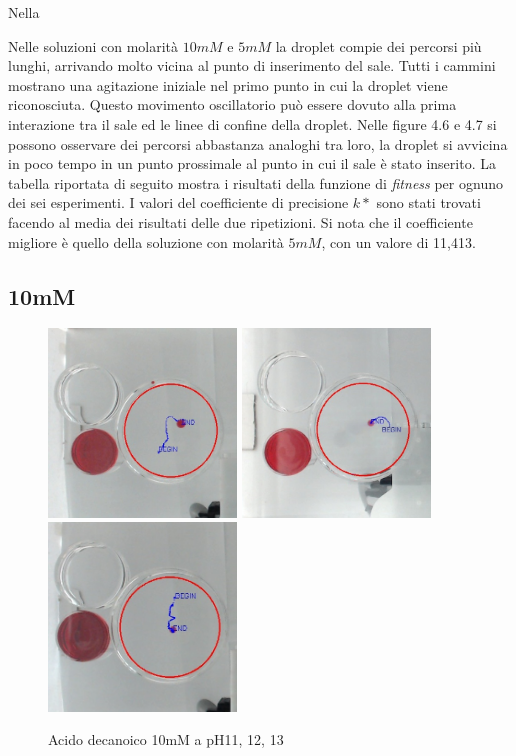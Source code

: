 Nella 




Nelle soluzioni con molarità $10mM$ e $5mM$ la droplet compie dei percorsi più lunghi, arrivando molto vicina al punto di inserimento del sale. Tutti i cammini mostrano una agitazione iniziale nel primo punto in cui la droplet viene riconosciuta. Questo movimento oscillatorio può essere dovuto alla prima interazione tra il sale ed le linee di confine della droplet.
Nelle figure 4.6 e 4.7 si possono osservare dei percorsi abbastanza analoghi tra loro, la droplet si avvicina in poco tempo in un punto prossimale al punto in cui il sale è stato inserito.
La tabella riportata di seguito mostra i risultati della funzione di \emph{fitness} per ognuno dei sei esperimenti. I valori  del coefficiente di precisione $k*$ sono stati trovati facendo al media dei risultati delle due ripetizioni. Si nota che il coefficiente migliore è quello della soluzione con molarità $5mM$, con un valore di 11,413.


\subsection{10mM}
\begin{figure}[h]
	\centering
   		{\includegraphics[width=5cm]{immagini/10mMph11-2.jpg}} %
 	\hspace{2mm}   	
		{\includegraphics[width=5cm]{immagini/10mMpH12-1.png}} %
	\hspace{2mm}   	
		{\includegraphics[width=5cm]{immagini/10mMpH13-2.jpg}}  %
	\caption{Acido decanoico 10mM a pH11, 12, 13}
\end{figure}

